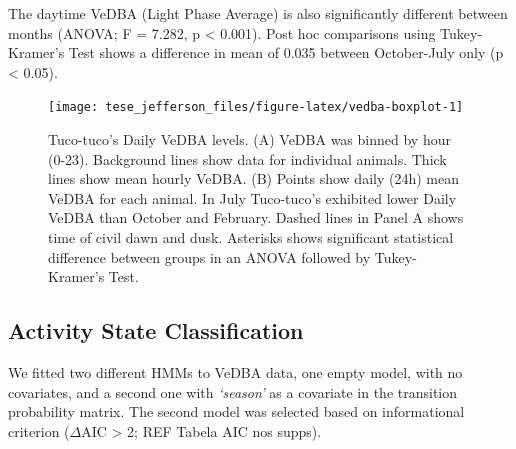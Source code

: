 \documentclass[english,msc,numbers,hidelinks]{coppe}
\begin{document}
  The daytime VeDBA (Light Phase Average) is also significantly different between months (ANOVA; F = 7.282, p \textless{} 0.001). Post hoc comparisons using Tukey-Kramer's Test shows a difference in mean of 0.035 between October-July only (p \textless{} 0.05). \newline
  \begin{figure}[H]

  {\centering \texttt{[image: tese\_jefferson\_files/figure-latex/vedba-boxplot-1]} 

  }

  \caption{Tuco-tuco's Daily VeDBA levels. (A) VeDBA was binned by hour (0-23). Background lines show data for individual animals. Thick lines show mean hourly VeDBA. (B) Points show daily (24h) mean VeDBA for each animal. In July Tuco-tuco's exhibited lower Daily VeDBA than October and February. Dashed lines in Panel A shows time of civil dawn and dusk. Asterisks shows significant statistical difference between groups in an ANOVA followed by Tukey-Kramer's Test.}\label{fig:vedba-boxplot}
  \end{figure}
  \hypertarget{activity-state-classification}{%
  \subsection{Activity State Classification}\label{activity-state-classification}}

  We fitted two different HMMs to VeDBA data, one empty model, with no covariates, and a second one with \emph{`season'} as a covariate in the transition probability matrix. The second model was selected based on informational criterion (\(\Delta\)AIC \textgreater{} 2; REF Tabela AIC nos supps).
\end{document}
